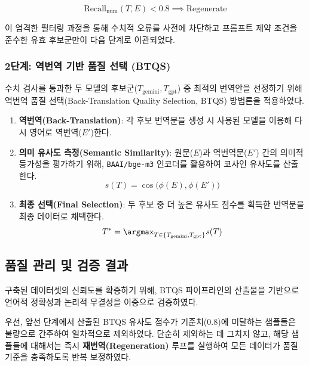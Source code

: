 \begin{equation}
    \text{Recall}_{\text{num}}(T, E) < 0.8 \implies \text{Regenerate}
\end{equation}

이 엄격한 필터링 과정을 통해 수치적 오류를 사전에 차단하고 프롬프트 제약 조건을 준수한 유효 후보군만이 다음 단계로 이관되었다.

\subsubsection{2단계: 역번역 기반 품질 선택 (BTQS)}

수치 검사를 통과한 두 모델의 후보군($T_{\text{gemini}}, T_{\text{gpt}}$) 중 최적의 번역안을 선정하기 위해 역번역 품질 선택(Back-Translation Quality Selection, BTQS) 방법론을 적용하였다.

\begin{enumerate}
    \item \textbf{역번역(Back-Translation)}: 각 후보 번역문을 생성 시 사용된 모델을 이용해 다시 영어로 역번역($E'$)한다.
    \item \textbf{의미 유사도 측정(Semantic Similarity)}: 원문($E$)과 역번역문($E'$) 간의 의미적 등가성을 평가하기 위해, \texttt{BAAI/bge-m3} 인코더를 활용하여 코사인 유사도를 산출한다.
    \begin{equation}
        s(T) = \cos\big(\phi(E), \phi(E')\big)
    \end{equation}
    \item \textbf{최종 선택(Final Selection)}: 두 후보 중 더 높은 유사도 점수를 획득한 번역문을 최종 데이터로 채택한다.
    \begin{equation}
        T^* = \argmax_{T \in \{T_{\text{gemini}}, T_{\text{gpt}}\}} s(T)
    \end{equation}
\end{enumerate}

\subsection{품질 관리 및 검증 결과}
\label{subsec:quality_control}

구축된 데이터셋의 신뢰도를 확증하기 위해, BTQS 파이프라인의 산출물을 기반으로 언어적 정확성과 논리적 무결성을 이중으로 검증하였다.

우선, 앞선 단계에서 산출된 BTQS 유사도 점수가 기준치($0.8$)에 미달하는 샘플들은 불량으로 간주하여 일차적으로 제외하였다. 단순히 제외하는 데 그치지 않고, 해당 샘플들에 대해서는 즉시 \textbf{재번역(Regeneration)} 루프를 실행하여 모든 데이터가 품질 기준을 충족하도록 반복 보정하였다.

